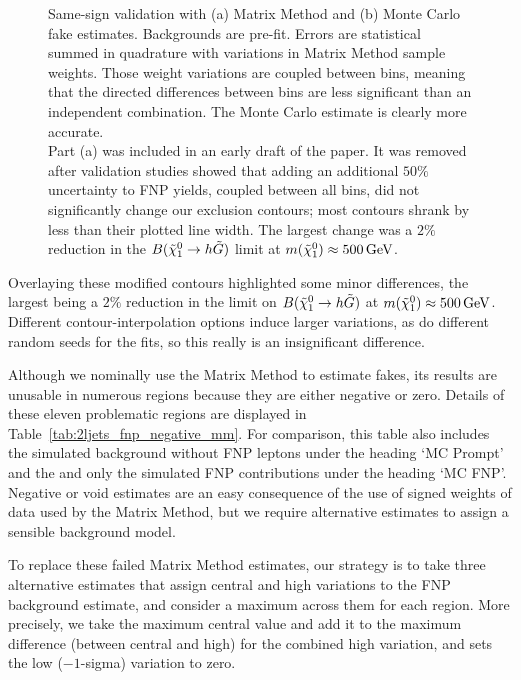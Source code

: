\begin{figure}[tp]
\begin{subfigure}{0.48\textwidth}
\caption{}
\label{fig:2ljets_vrss_mc}
\end{subfigure}
\caption[
Same-sign validation with Matrix Method and Monte Carlo fake estimates
]{%
Same-sign validation with (a) Matrix Method and (b) Monte Carlo fake estimates.
Backgrounds are pre-fit.
Errors are statistical summed in quadrature with variations in Matrix Method
sample weights.
Those weight variations are coupled between bins, meaning that the
directed differences between bins are less significant than an independent
combination.
The Monte Carlo estimate is clearly more accurate.
\\[0.5em]
Part (a) was included in an early draft of the paper.
It was removed after validation studies showed that adding an additional
$50\%$ uncertainty to FNP yields, coupled between all bins, did not
significantly change our exclusion contours;
most contours shrank by less than their plotted line width.
The largest change was a $2\%$ reduction in the
$B(\neutralino_1 \to h \gravitino)$
limit at $m(\neutralino_1) \approx 500\,\eV[G]$.
}
\label{fig:2ljets_vrss}
\end{figure}

Overlaying these modified contours highlighted some minor differences, the
largest being a $2\%$ reduction in the limit on
$B(\neutralino_1 \to h \gravitino)$ at
$m(\neutralino_1) \approx 500\,\eV[G]$.
Different contour-interpolation options induce larger variations, as do
different random seeds for the fits, so this really is an insignificant
difference.

Although we nominally use the Matrix Method to estimate fakes, its results
are unusable in numerous regions because they are either negative or zero.
Details of these eleven problematic regions are displayed in
Table~\ref{tab:2ljets_fnp_negative_mm}.
For comparison, this table also includes the simulated background without
FNP leptons under the heading `MC Prompt' and the and only
the simulated FNP contributions under the heading `MC FNP'.
Negative or void estimates are an easy consequence of the use of signed
weights of data used by the Matrix Method, but we require alternative
estimates to assign a sensible background model.

To replace these failed Matrix Method estimates, our strategy is to take three
alternative estimates that assign central and high variations to the
FNP background estimate, and consider a maximum across them for
each region.
More precisely, we take the maximum central value and add it to the maximum
difference (between central and high) for the combined high variation, and
sets the low ($-1$-sigma) variation to zero.

